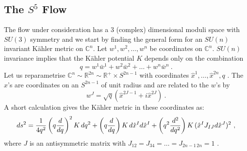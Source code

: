 \documentclass[a4paper,12pt]{article}
\newcommand{\labell}[1]{\label{#1}}
\begin{document}
\subsection{The $S^5$ Flow}
\label{lslike}
The flow under consideration has a 3 (complex) dimensional moduli
space with $SU(3)$ symmetry and we start by finding the general form
for an $SU(n)$ invariant K\"ahler metric on $\mathbb{C}^n$. Let $w^1,
w^2, \ldots, w^n$ be coordinates on $\mathbb{C}^n$. $SU(n)$ invariance
implies that the K\"ahler potential $K$ depends only on the combination
% 
\begin{equation}
  q=w^1\bar{w}^1 + w^2\bar{w}^2 + \ldots + w^n\bar{w}^n\ .
\end{equation}
Let us reparametrise $\mathbb{C}^n \sim \mathbb{R}^{2n} \sim
\mathbb{R}^+ \times S^{2n-1}$ with coordinates $\hat{x}^1, \ldots
,\hat{x}^{2n} ,q$ . The $\hat{x}$'s are coordinates on an $S^{2n-1}$
of unit radius and are related to the $w$'s by
\begin{equation}
w^J = \sqrt{q} (\hat{x}^{2J-1} + i \hat{x}^{2J})\ . 
\end{equation}
A short calculation gives the K\"ahler metric in these coordinates as:
\begin{equation}
ds^2 = {1 \over 4q^2} \left(q {d \over dq}\right)^2 K\, dq^2 + \left(q {d \over dq}\right) K\, d\hat{x}^I d\hat{x}^I + \left(q^2 {d^2 \over dq^2}\right) K \, (\hat{x}^I J_{IJ} d\hat{x}^J)^2\ ,
\labell{SU(n)metric}
\end{equation}
where $J$ is an antisymmetric matrix with $J_{12} = J_{34} = \ldots =
J_{2n-1 \, 2n} = 1$ .
\end{document}
